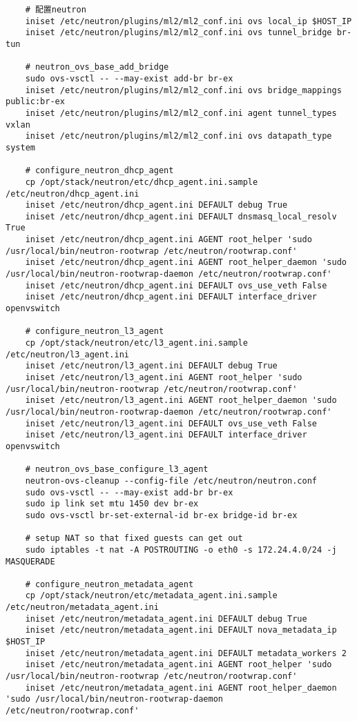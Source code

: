 \documentclass[a4paper,left=1.5cm,right=1.5cm,11pt]{article}
\begin{document}
\begin{lstlisting}
	# 配置neutron
	iniset /etc/neutron/plugins/ml2/ml2_conf.ini ovs local_ip $HOST_IP
	iniset /etc/neutron/plugins/ml2/ml2_conf.ini ovs tunnel_bridge br-tun

	# neutron_ovs_base_add_bridge
	sudo ovs-vsctl -- --may-exist add-br br-ex
	iniset /etc/neutron/plugins/ml2/ml2_conf.ini ovs bridge_mappings public:br-ex
	iniset /etc/neutron/plugins/ml2/ml2_conf.ini agent tunnel_types vxlan
	iniset /etc/neutron/plugins/ml2/ml2_conf.ini ovs datapath_type system

	# configure_neutron_dhcp_agent
	cp /opt/stack/neutron/etc/dhcp_agent.ini.sample /etc/neutron/dhcp_agent.ini
	iniset /etc/neutron/dhcp_agent.ini DEFAULT debug True
	iniset /etc/neutron/dhcp_agent.ini DEFAULT dnsmasq_local_resolv True
	iniset /etc/neutron/dhcp_agent.ini AGENT root_helper 'sudo /usr/local/bin/neutron-rootwrap /etc/neutron/rootwrap.conf'
	iniset /etc/neutron/dhcp_agent.ini AGENT root_helper_daemon 'sudo /usr/local/bin/neutron-rootwrap-daemon /etc/neutron/rootwrap.conf'
	iniset /etc/neutron/dhcp_agent.ini DEFAULT ovs_use_veth False
	iniset /etc/neutron/dhcp_agent.ini DEFAULT interface_driver openvswitch

	# configure_neutron_l3_agent
	cp /opt/stack/neutron/etc/l3_agent.ini.sample /etc/neutron/l3_agent.ini
	iniset /etc/neutron/l3_agent.ini DEFAULT debug True
	iniset /etc/neutron/l3_agent.ini AGENT root_helper 'sudo /usr/local/bin/neutron-rootwrap /etc/neutron/rootwrap.conf'
	iniset /etc/neutron/l3_agent.ini AGENT root_helper_daemon 'sudo /usr/local/bin/neutron-rootwrap-daemon /etc/neutron/rootwrap.conf'
	iniset /etc/neutron/l3_agent.ini DEFAULT ovs_use_veth False
	iniset /etc/neutron/l3_agent.ini DEFAULT interface_driver openvswitch
	
	# neutron_ovs_base_configure_l3_agent
	neutron-ovs-cleanup --config-file /etc/neutron/neutron.conf
	sudo ovs-vsctl -- --may-exist add-br br-ex
	sudo ip link set mtu 1450 dev br-ex
	sudo ovs-vsctl br-set-external-id br-ex bridge-id br-ex

	# setup NAT so that fixed guests can get out
	sudo iptables -t nat -A POSTROUTING -o eth0 -s 172.24.4.0/24 -j MASQUERADE

	# configure_neutron_metadata_agent
	cp /opt/stack/neutron/etc/metadata_agent.ini.sample /etc/neutron/metadata_agent.ini
	iniset /etc/neutron/metadata_agent.ini DEFAULT debug True
	iniset /etc/neutron/metadata_agent.ini DEFAULT nova_metadata_ip $HOST_IP
	iniset /etc/neutron/metadata_agent.ini DEFAULT metadata_workers 2
	iniset /etc/neutron/metadata_agent.ini AGENT root_helper 'sudo /usr/local/bin/neutron-rootwrap /etc/neutron/rootwrap.conf'
	iniset /etc/neutron/metadata_agent.ini AGENT root_helper_daemon 'sudo /usr/local/bin/neutron-rootwrap-daemon /etc/neutron/rootwrap.conf'


\end{lstlisting}
\end{document}
